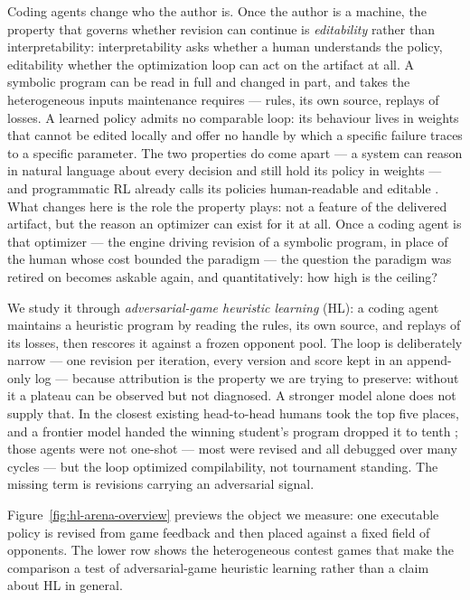Coding agents change who the author is. Once the author is a machine, the property
that governs whether revision can continue is \emph{editability} rather than
interpretability: interpretability asks whether a
human understands the policy, editability whether the optimization loop can act on
the artifact at all. A symbolic program can be read in full and changed in part, and
takes the heterogeneous inputs maintenance requires --- rules, its own source,
replays of losses. A learned policy admits no comparable loop: its behaviour lives in
weights that cannot be edited locally and offer no handle by which a specific failure
traces to a specific parameter. The two properties do come apart --- a system can
reason in natural language about every decision and still hold its policy in weights
\citep{tig2025think} --- and programmatic RL already calls its policies human-readable
and editable \citep[DiPRL;][]{diprl2026}. What changes here is the role the property
plays: not a feature of the delivered artifact, but the reason an optimizer can exist
for it at all. Once a coding agent is that optimizer --- the engine driving revision
of a symbolic program, in place of the human whose cost bounded the paradigm --- the
question the paradigm was retired on becomes askable again, and quantitatively: how
high is the ceiling?

We study it through \emph{adversarial-game heuristic learning} (HL): a coding agent maintains a heuristic program
by reading the rules, its own source, and replays of its losses, then rescores it
against a frozen opponent pool. The loop is deliberately narrow --- one revision per
iteration, every version and score kept in an append-only log --- because attribution
is the property we are trying to preserve: without it a plateau can be observed but
not diagnosed. A stronger model alone does not supply that. In the closest existing
head-to-head humans took the top five places, and a frontier model handed the winning
student's program dropped it to tenth \citep{vibecoding2025tournament}; those agents
were not one-shot --- most were revised and all debugged over many cycles --- but the
loop optimized compilability, not tournament standing. The missing term is revisions
carrying an adversarial signal.

Figure~\ref{fig:hl-arena-overview} previews the object we measure: one executable policy
is revised from game feedback and then placed against a fixed field of opponents. The
lower row shows the heterogeneous contest games that make the comparison a test of
adversarial-game heuristic learning rather than a claim about HL in general.


